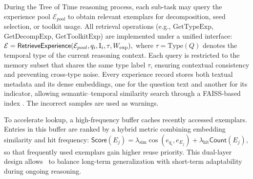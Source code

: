 During the Tree of Time reasoning process, each sub-task may query the experience pool 
$\mathcal{E}_{pool}$ to obtain relevant exemplars for decomposition, seed selection, or toolkit usage.  
All retrieval operations (e.g., $\text{GetTypeExp}$, $\text{GetDecompExp}$, $\text{GetToolkitExp}$) 
are implemented under a unified interface: 
$\mathcal{E} = 
\textsf{RetrieveExperience}(\mathcal{E}_{pool}, q_i, \mathrm{I}_i, \tau, W_{\text{exp}}),$
where $\tau=\text{Type}(Q)$ denotes the temporal type of the current reasoning context. 
Each query is restricted to the memory subset that shares the same type label $\tau$, 
ensuring contextual consistency and preventing cross-type noise.  
Every experience record stores both textual metadata and its dense embeddings, one for the question text 
and another for its indicator, allowing semantic–temporal similarity search through a FAISS-based index \cite{douze2024faiss}.  The incorrect samples are used as warnings.

To accelerate lookup, a high-frequency buffer caches recently accessed exemplars.  
Entries in this buffer are ranked by a hybrid metric combining embedding similarity and hit frequency:
$
\textsf{Score}(E_j) = \lambda_{\text{sim}}\cos(e_{q_i}, e_{E_j}) 
+ \lambda_{\text{hit}}\textsf{Count}(E_j),
$
so that frequently used exemplars gain higher reuse priority.  
This dual-layer design allows \mot\ to balance long-term generalization with short-term adaptability during ongoing reasoning.



